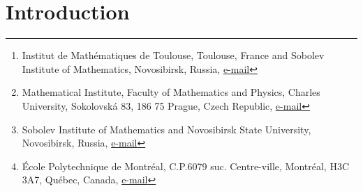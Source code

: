\documentclass[twoside]{article}
\date{Compiled on \today\ at \currenttime}} %
\title{\vspace{-15mm}\fontsize{16pt}{10pt}\selectfont{Continuum Mechanics and 
Thermodynamics \\ in the Hamilton and the Godunov-type 
Formulations}}
\author{
\large
\textsc{Ilya Peshkov\thanks{Institut de Math\'{e}matiques de Toulouse, 
Toulouse, France and Sobolev Institute of 
Mathematics, Novosibirsk, Russia, \href{mailto:peshenator@gmail.com}{e-mail}},
\ \
% 
Michal Pavelka\thanks{Mathematical Institute, Faculty of Mathematics and 
Physics, Charles University, Sokolovsk\'{a} 83, 186 75 Prague, Czech Republic, 
\href{mailto:pavelka@karlin.mff.cuni.cz}{e-mail}}, 
\ \
%
Evgeniy Romenski\thanks{Sobolev 
Institute of Mathematics and Novosibirsk State University, Novosibirsk, 
Russia, \href{mailto:evrom@math.nsc.ru}{e-mail}},\ \
%
Miroslav Grmela\thanks{\'{E}cole Polytechnique de Montr\'{e}al, C.P.6079 suc. 
Centre-ville, Montr\'{e}al, H3C 3A7, Qu\'{e}bec, Canada, 
\href{mailto:miroslav.grmela@polymtl.ca}{e-mail}
}
}
}
\date{}
\begin{document}
\maketitle


\renewcommand{\abstractname}{Spoiler}
\vspace{-20mm}
\begin{abstract}
\vspace{-5mm}
\noindent Continuum mechanics with dislocations, with the  Cattaneo type heat 
conduction, with mass transfer,  and with electromagnetic fields is put into  
the Hamiltonian form 
and into the form of the  Godunov type system of the first order, symmetric  
hyperbolic partial differential equations (SHTC equations). The compatibility 
with thermodynamics  of the time reversible part of the governing equations is 
mathematically expressed in the former formulation as degeneracy of the 
Hamiltonian structure and in the latter formulation as  the existence of a 
companion conservation law. In both formulations the time irreversible part 
represents gradient dynamics. The  Godunov type formulation brings the 
mathematical rigor (the well-posedness of the Cauchy initial value problem) and 
the possibility to  discretize while keeping the physical content of the 
governing equations (the Godunov finite volume discretization).
\end{abstract}

\thispagestyle{fancy} %
\thispagestyle{firstpagestyle}

{\hypersetup{linkcolor=black} \tableofcontents}

\section{Introduction}\label{sec.Intro}
\end{document}
